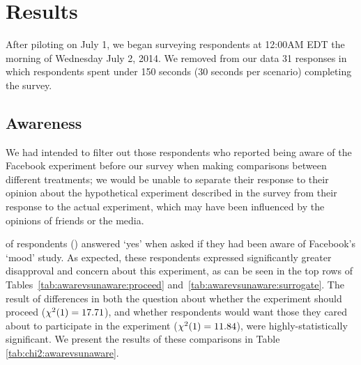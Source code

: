 
\section{Results}
After piloting on July 1, we began surveying respondents at 12:00AM EDT the morning of Wednesday July 2, 2014.  We removed from our data 31 responses in which respondents spent under 150 seconds (30 seconds per scenario) completing the survey.

\subsection{Awareness}
We had intended to filter out those respondents who reported being aware of the Facebook experiment before our survey when making comparisons between different treatments; we would be unable to separate their response to their opinion about the hypothetical experiment described in the survey from their response to the actual experiment, which may have been influenced by the opinions of friends or the media.



 of  respondents () answered `yes' when asked if they had been aware of Facebook's `mood' study.
As expected, these respondents expressed significantly greater disapproval and concern about this experiment, as can be seen in the top rows of Tables~\ref{tab:awarevsunaware:proceed} and~\ref{tab:awarevsunaware:surrogate}. The result of differences in both the question about whether the experiment should proceed ($\chi^2(1)=17.71$), and whether respondents would want those they cared about to participate in the experiment ($\chi^2(1)=11.84$), were highly-statistically significant. We present the results of these comparisons in Table \ref{tab:chi2:awarevsunaware}.

